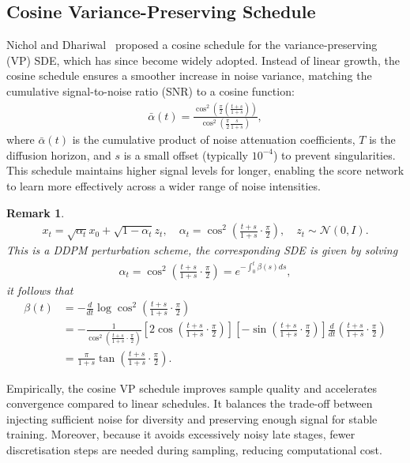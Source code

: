 \documentclass[12pt]{report}
\newtheorem{remark}{Remark}[section]
\begin{document}
\subsection*{Cosine Variance-Preserving Schedule}
Nichol and Dhariwal~\cite{nicholImprovedDenoisingDiffusion2021} proposed a cosine schedule for the variance-preserving (VP) SDE, which has since become widely adopted. 
Instead of linear growth, the cosine schedule ensures a smoother increase in noise variance, matching the cumulative signal-to-noise ratio (SNR) to a cosine function:
\begin{align*}
    \bar \alpha(t) = \frac{\cos^2\!\left(\frac{\pi}{2}(\frac{t+s}{1+s})\right)}{\cos^2\!\left(\frac{\pi}{2}\frac{s}{1+s}\right)},
\end{align*}
where $\bar \alpha(t)$ is the cumulative product of noise attenuation coefficients, $T$ is the diffusion horizon, and $s$ is a small offset (typically $10^{-4}$) to prevent singularities. 
This schedule maintains higher signal levels for longer, enabling the score network to learn more effectively across a wider range of noise intensities.
\begin{remark}
    \begin{align*}
        x_t=\sqrt{\alpha_t}x_0+\sqrt{1-\alpha_t}z_t,\quad\alpha_t=\cos^2\left(\frac{t+s}{1+s}\cdot\frac{\pi}{2}\right),\quad z_t\sim\mathcal{N}\left(0, I\right).
    \end{align*}
    This is a DDPM perturbation scheme, the corresponding SDE is given by solving
    \begin{align*}
        \alpha_t=\cos^2\left(\frac{t+s}{1+s}\cdot\frac{\pi}{2}\right)=e^{-\int_0^t\beta(s)ds},
    \end{align*}
    it follows that
    \begin{align*}
        \beta(t)
        &=-\frac{d}{dt}\log\cos^2\left(\frac{t+s}{1+s}\cdot\frac{\pi}{2}\right)\\
        &=-\frac{1}{\cos^2\left(\frac{t+s}{1+s}\cdot\frac{\pi}{2}\right)}\left[2\cos\left(\frac{t+s}{1+s}\cdot\frac{\pi}{2}\right)\right]\left[-\sin\left(\frac{t+s}{1+s}\cdot\frac{\pi}{2}\right)\right]\frac{d}{dt}\left(\frac{t+s}{1+s}\cdot\frac{\pi}{2}\right)\\
        &=\frac{\pi}{1+s}\tan\left(\frac{t+s}{1+s}\cdot\frac{\pi}{2}\right).
    \end{align*}
\end{remark}
Empirically, the cosine VP schedule improves sample quality and accelerates convergence compared to linear schedules. It balances the trade-off between injecting sufficient noise for diversity and preserving enough signal for stable training. Moreover, because it avoids excessively noisy late stages, fewer discretisation steps are needed during sampling, reducing computational cost.
\end{document}
